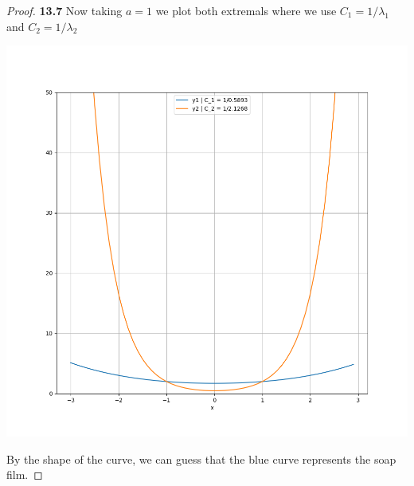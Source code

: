 \documentclass[11pt]{article}
\theoremstyle{definition}
\begin{document}
\begin{proof}{\textbf{13.7}}
    \cleardoublepage
    Now taking $a = 1$ we plot both extremals where we use
    $C_1 = 1/\lambda_1$ and $C_2 = 1/\lambda_2$
    \begin{center}
        \includegraphics[scale=0.4]{ch13-7_4.png}
    \end{center}
    By the shape of the curve, we can guess that the blue curve represents the
    soap film.
\end{proof}
\cleardoublepage
\end{document}
